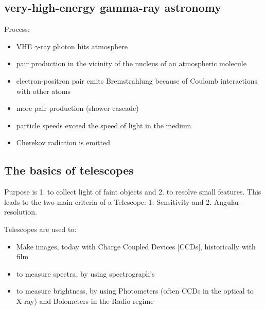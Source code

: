 \documentclass[11pt,a4paper]{article}
\begin{document}
\subsection{very-high-energy gamma-ray astronomy}
Process: 
\begin{itemize}
    \item VHE $\gamma$-ray photon hits atmosphere 
    \item pair production in the vicinity of the nucleus of an atmospheric molecule
    \item electron-positron pair emits Bremstrahlung because of Coulomb interactions with other atoms
    \item more pair production (shower cascade)
    \item particle speeds exceed the speed of light in the medium
    \item Cherekov radiation is emitted
\end{itemize}
\subsection{The basics of telescopes}
Purpose is 1. to collect light of faint objects and 2. to resolve small features.
This leads to the two main criteria of a Telescope: 1. Sensitivity and 2. Angular resolution.

Telescopes are used to: 
\begin{itemize}
    \item Make images, today with Charge Coupled Devices [CCDs], historically with film
    \item to measure spectra, by using spectrograph's
    \item to measure brightness, by using Photometers (often CCDs in the optical to X-ray) and Bolometers in the Radio regime
\end{itemize}
\end{document}
